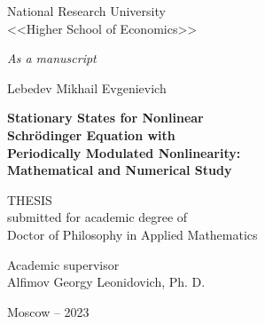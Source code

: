 \begin{titlepage}
\thispagestyle{empty}
\enlargethispage{1cm}
\vspace*{-2cm}

\begin{center}
	National Research University \\ <<Higher School of Economics>>
\end{center}

\vskip1cm
	
\begin{flushright}
	\emph{As a manuscript}
\end{flushright}
	
\vskip3cm

\begin{center}
	{\large Lebedev Mikhail Evgenievich}
	\vskip1cm
	{\Large\bfseries Stationary States for Nonlinear \\ Schr\"odinger Equation with \\ Periodically Modulated Nonlinearity: \\ Mathematical and Numerical Study\par}
	\vskip1.5cm
	{THESIS \\ submitted for academic degree of \\ Doctor of Philosophy in Applied Mathematics}
\end{center}

\vskip2cm

\hspace{8cm}\begin{minipage}{0.45\linewidth}
	Academic supervisor \\
	Alfimov Georgy Leonidovich, Ph. D.
\end{minipage}

\vfill

\begin{center}
	{Moscow -- 2023}
\end{center}

\normalfont\clearpage
\end{titlepage}
